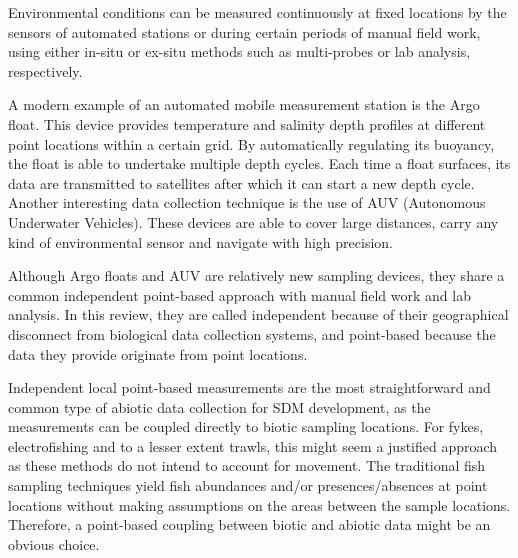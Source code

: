 \documentclass[12pt,authoryear]{elsarticle}
\begin{document}
Environmental conditions can be measured continuously at fixed locations by the sensors of automated stations or during certain periods of manual field work, using either in-situ or ex-situ methods such as multi-probes or lab analysis, respectively. 

A modern example of an automated mobile measurement station is the Argo float. This device provides temperature and salinity depth profiles at different point locations within a certain grid. By automatically regulating its buoyancy, the float is able to undertake multiple depth cycles. Each time a float surfaces, its data are transmitted to satellites after which it can start a new depth cycle. Another interesting data collection technique is the use of AUV (Autonomous Underwater Vehicles). These devices are able to cover large distances, carry any kind of environmental sensor and navigate with high precision. 

Although Argo floats and AUV are relatively new sampling devices, they share a common independent point-based approach with manual field work and lab analysis. In this review, they are called independent because of their geographical disconnect from biological data collection systems, and point-based because the data they provide originate from point locations. 

\vspace{5mm}

Independent local point-based measurements are the most straightforward and common type of abiotic data collection for SDM development, as the measurements can be coupled directly to biotic sampling locations. For fykes, electrofishing and to a lesser extent trawls, this might seem a justified approach as these methods do not intend to account for movement. The traditional fish sampling techniques yield fish abundances and/or presences/absences at point locations without making assumptions on the areas between the sample locations. Therefore, a point-based coupling between biotic and abiotic data might be an obvious choice. 
\end{document}
